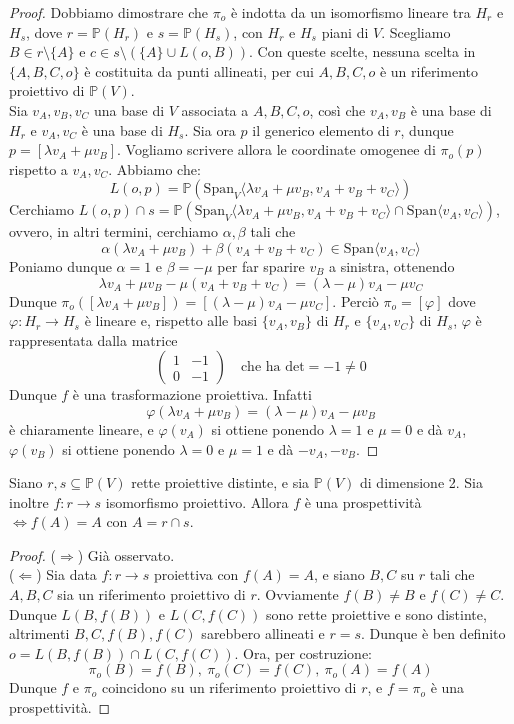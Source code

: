 \begin{proof}
Dobbiamo dimostrare che $\pi_o$ è indotta da un isomorfismo lineare tra $H_r$ e $H_s$, dove $r=\mathbb{P}(H_r)$ e $s=\mathbb{P}(H_s)$, con $H_r$ e $H_s$ piani di $V$. Scegliamo $B \in r \setminus \{A\}$ e $c \in s \setminus (\{A\} \cup L(o,B))$. Con queste scelte, nessuna scelta in $\{A,B,C,o\}$ è costituita da punti allineati, per cui $A,B,C,o$ è un riferimento proiettivo di $\mathbb{P}(V)$.\\
Sia $v_A,v_B,v_C$ una base di $V$ associata a $A,B,C,o$, così che $v_A,v_B$ è una base di $H_r$ e $v_A,v_C$ è una base di $H_s$. Sia ora $p$ il generico elemento di $r$, dunque $p=[\lambda v_A+\mu v_B]$. Vogliamo scrivere allora le coordinate omogenee di $\pi_o(p)$ rispetto a $v_A,v_C$. Abbiamo che:
$$L(o,p)=\mathbb{P}(\text{Span}_V \langle \lambda v_A+\mu v_B, v_A+v_B+v_C \rangle )$$
Cerchiamo $L(o,p) \cap s=\mathbb{P}(\text{Span}_V \langle \lambda v_A+\mu v_B, v_A+v_B+v_C \rangle \cap \text{Span} \langle v_A,v_C \rangle)$, ovvero, in altri termini, cerchiamo $\alpha,\beta$ tali che
$$\alpha (\lambda v_A+\mu v_B)+\beta(v_A+v_B+v_C) \in \text{Span} \langle v_A,v_C \rangle$$
Poniamo dunque $\alpha=1$ e $\beta =-\mu$ per far sparire $v_B$ a sinistra, ottenendo
$$\lambda v_A+\mu v_B -\mu (v_A+v_B+v_C)=(\lambda -\mu)v_A-\mu v_C$$
Dunque $\pi_o([\lambda v_A+\mu v_B])=[(\lambda -\mu)v_A -\mu v_C]$. Perciò $\pi_o=[\varphi]$ dove $\varphi :H_r \rightarrow H_s$ è lineare e, rispetto alle basi $\{v_A,v_B\}$ di $H_r$ e $\{v_A,v_C\}$ di $H_s$, $\varphi$ è rappresentata dalla matrice
$$\begin{pmatrix}
1 & -1 \\ 0 & -1
\end{pmatrix} \quad \text{che ha det}=-1\neq 0$$
Dunque $f$ è una trasformazione proiettiva. Infatti
$$\varphi (\lambda v_A+\mu v_B)=(\lambda -\mu)v_A-\mu v_B$$
è chiaramente lineare, e $\varphi (v_A)$ si ottiene ponendo $\lambda =1$ e $\mu =0$ e dà $v_A$, $\varphi (v_B)$ si ottiene ponendo $\lambda =0$ e $\mu =1$ e dà $-v_A,-v_B$.
\end{proof}

\begin{thm}
Siano $r,s \subseteq \mathbb{P}(V)$ rette proiettive distinte, e sia $\mathbb{P}(V)$ di dimensione 2. Sia inoltre $f:r\rightarrow s$ isomorfismo proiettivo. Allora $f$ è una prospettività $\Leftrightarrow f(A)=A$ con $A=r \cap s$.
\end{thm}

\begin{proof}
($\Rightarrow$) Già osservato.\\
($\Leftarrow$) Sia data $f:r \rightarrow s$ proiettiva con $f(A)=A$, e siano $B,C$ su $r$ tali che $A,B,C$ sia un riferimento proiettivo di $r$. Ovviamente $f(B) \neq B$ e $f(C) \neq C$. Dunque $L(B,f(B))$ e $L(C,f(C))$ sono rette proiettive e sono distinte, altrimenti $B, C, f(B), f(C)$ sarebbero allineati e $r=s$. Dunque è ben definito $o=L(B,f(B)) \cap L(C,f(C))$. Ora, per costruzione:
$$\pi _o(B)=f(B),\ \pi_o(C)=f(C),\ \pi_o(A)=f(A)$$
Dunque $f$ e $\pi_o$ coincidono su un riferimento proiettivo di $r$, e $f=\pi_o$ è una prospettività.
\end{proof}